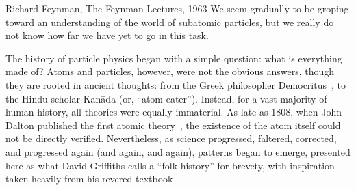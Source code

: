 \begin{dissertationintroduction}
\begin{aquote}{Richard Feynman, The Feynman Lectures, 1963}
    We seem gradually to be groping toward an understanding of the world of subatomic particles, but we really do not know how far we have yet to go in this task.
\end{aquote}
The history of particle physics began with a simple question: what is everything made of? 
Atoms and particles, however, were not the obvious answers, though they are rooted in ancient thoughts: from the Greek philosopher Democritus~\cite{Taylor1419554}, to the Hindu scholar Kan\=ada (or, ``atom-eater''). %
Instead, for a vast majority of human history, all theories were equally immaterial. 
As late as 1808, when John Dalton published the first\footnotemark{} atomic theory~\cite{Dalton1805, Dalton1808}, the existence of the atom itself could not be directly verified. 
Nevertheless, as science progressed, faltered, corrected, and progressed again (and again, and again), patterns began to emerge, presented here as what David Griffiths calls a ``folk history'' for brevety, with inspiration taken heavily from his revered textbook~\cite{Griffiths}.  


\end{dissertationintroduction}
